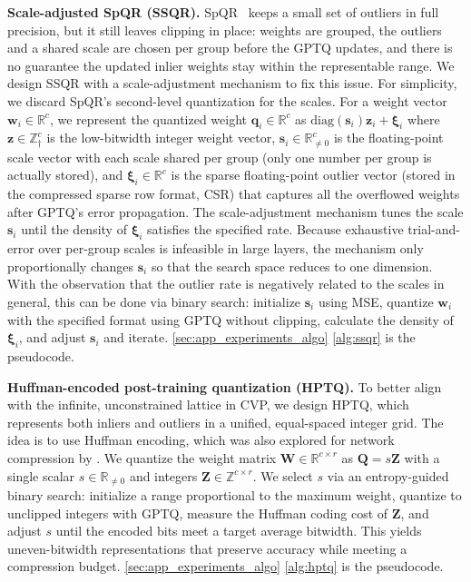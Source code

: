 \documentclass{article} %
\begin{document}
\textbf{Scale-adjusted SpQR (SSQR).}
SpQR~\citep{dettmers2024spqr} keeps a small set of outliers in full precision, but it still leaves clipping in place: weights are grouped, the outliers and a shared scale are chosen per group before the GPTQ updates, and there is no guarantee the updated inlier weights stay within the representable range.
We design SSQR with a scale-adjustment mechanism to fix this issue.
For simplicity, we discard SpQR's second-level quantization for the scales.
For a weight vector $\bm{w}_{i} \in \mathbb{R}^{c}$, we represent the quantized weight $\bm{q}_{i} \in \mathbb{R}^{c}$ as $\mathrm{diag} \left( \bm{s}_{i} \right) \bm{z}_{i} + \bm{\xi}_{i}$ where $\bm{z} \in \mathbb{Z}_{\dagger}^{c}$ is the low-bitwidth integer weight vector, $\bm{s}_{i} \in \mathbb{R}_{\ne 0}^{c}$ is the floating-point scale vector with each scale shared per group (only one number per group is actually stored), and $\bm{\xi}_{i} \in \mathbb{R}^{c}$ is the sparse floating-point outlier vector (stored in the compressed sparse row format, CSR) that captures all the overflowed weights after GPTQ's error propagation.
The scale-adjustment mechanism tunes the scale $\bm{s}_{i}$ until the density of $\bm{\xi}_{i}$ satisfies the specified rate. Because exhaustive trial-and-error over per-group scales is infeasible in large layers, the mechanism only proportionally changes $\bm{s}_{i}$ so that the search space reduces to one dimension. With the observation that the outlier rate is negatively related to the scales in general, this can be done via binary search: initialize $\bm{s}_{i}$ using MSE, quantize $\bm{w}_{i}$ with the specified format using GPTQ without clipping, calculate the density of $\bm{\xi}_{i}$, and adjust $\bm{s}_{i}$ and iterate.
\cref{sec:app_experiments_algo} \cref{alg:ssqr} is the pseudocode.

\textbf{Huffman-encoded post-training quantization (HPTQ).}
To better align with the infinite, unconstrained lattice in CVP, we design HPTQ, which represents both inliers and outliers in a unified, equal-spaced integer grid.
The idea is to use Huffman encoding, which was also explored for network compression by \citet{choi2017towards}.
We quantize the weight matrix $\bm{W} \in \mathbb{R}^{c \times r}$ as $\bm{Q} = s \bm{Z}$ with a single scalar $s \in \mathbb{R}_{\ne 0}$ and integers $\bm{Z} \in \mathbb{Z}^{c \times r}$. We select $s$ via an entropy-guided binary search: initialize a range proportional to the maximum weight, quantize to unclipped integers with GPTQ, measure the Huffman coding cost of $\bm{Z}$, and adjust $s$ until the encoded bits meet a target average bitwidth. This yields uneven-bitwidth representations that preserve accuracy while meeting a compression budget.
\cref{sec:app_experiments_algo} \cref{alg:hptq} is the pseudocode.
\end{document}
